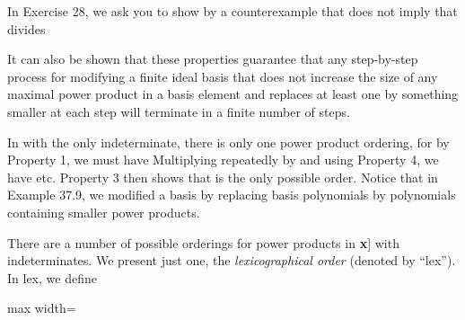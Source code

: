 \documentclass[11pt,oneside]{article}
\begin{document}
\begin{BookBody}

\noindent {} In Exercise 28, we ask you to show by a counterexample that  does not imply that  divides 






\noindent It can also be shown that these properties guarantee that any step-by-step process for modifying a finite ideal basis that does not increase the size of any maximal power product in a basis element and replaces at least one by something smaller at each step will terminate in a finite number of steps.

In  with  the only indeterminate, there is only one power product ordering, for by Property 1, we must have  Multiplying repeatedly by  and using Property 4, we have  etc. Property 3 then shows that  is the only possible order. Notice that in Example 37.9, we modified a basis by replacing basis polynomials by polynomials containing smaller power products.

There are a number of possible orderings for power products in \BookInline{F[}\textbf{x}] with  indeterminates. We present just one, the\textit{ lexicographical order} (denoted by “lex”). In lex, we define

\begin{center}\begin{adjustbox}{max width=\linewidth}\end{adjustbox}\end{center}


\end{BookBody}
\end{document}
